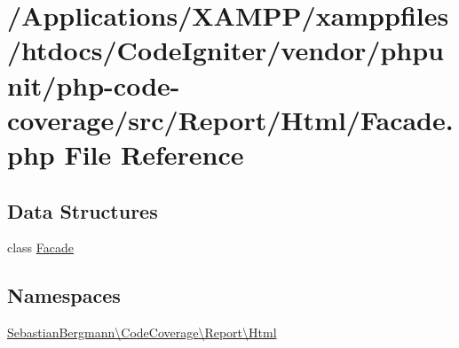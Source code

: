 \hypertarget{php-code-coverage_2src_2_report_2_html_2_facade_8php}{}\section{/\+Applications/\+X\+A\+M\+P\+P/xamppfiles/htdocs/\+Code\+Igniter/vendor/phpunit/php-\/code-\/coverage/src/\+Report/\+Html/\+Facade.php File Reference}
\label{php-code-coverage_2src_2_report_2_html_2_facade_8php}
\subsection*{Data Structures}
\begin{DoxyCompactItemize}
\item 
class \mbox{\hyperlink{class_sebastian_bergmann_1_1_code_coverage_1_1_report_1_1_html_1_1_facade}{Facade}}
\end{DoxyCompactItemize}
\subsection*{Namespaces}
\begin{DoxyCompactItemize}
\item 
 \mbox{\hyperlink{namespace_sebastian_bergmann_1_1_code_coverage_1_1_report_1_1_html}{Sebastian\+Bergmann\textbackslash{}\+Code\+Coverage\textbackslash{}\+Report\textbackslash{}\+Html}}
\end{DoxyCompactItemize}
